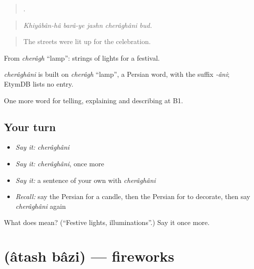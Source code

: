 \begin{quote}
     .
\end{quote}

\begin{quote}
\emph{Khiyâbân-hâ barâ-ye jashn cherâghâni bud.}
\end{quote}

\begin{quote}
The streets were lit up for the celebration.
\end{quote}

From \emph{cherâgh} \textquotedblleft{}lamp\textquotedblright{}: strings of lights for a festival.

\begin{cousinweb}
\emph{cherâghâni} is built on \emph{cherâgh} \textquotedblleft{}lamp\textquotedblright{}, a Persian word, with the suffix \emph{-âni}; EtymDB lists no entry.
\end{cousinweb}

\begin{grammarlens}[title={What you've built}]
One more word for telling, explaining and describing at B1.
\end{grammarlens}

\subsection*{Your turn}
\begin{itemize}
\raggedright
  \item \emph{Say it:} \emph{cherâghâni}
  \item \emph{Say it:} \emph{cherâghâni}, once more
  \item \emph{Say it:} a sentence of your own with \emph{cherâghâni}
  \item \emph{Recall:} say the Persian for a candle, then the Persian for to decorate, then say \emph{cherâghâni} again
\end{itemize}

\begin{tcolorbox}[breakable,colback=teal!4,colframe=teal!35!black,title={Before you move on}]
What does  mean? (\textquotedblleft{}Festive lights, illuminations\textquotedblright{}.) Say it once more.
\end{tcolorbox}
\section[\texorpdfstring{\fa{آتش} \fa{بازی} (âtash bâzi)}{آتش بازی (âtash bâzi)}]{  (âtash bâzi) — fireworks}

